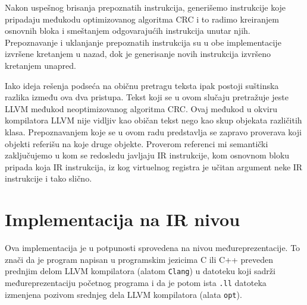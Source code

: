 \documentclass[12pt,oneside]{memoir}
\begin{document}
Nakon uspešnog brisanja prepoznatih instrukcija, generišemo instrukcije koje pripadaju međukodu optimizovanog algoritma CRC i to radimo kreiranjem osnovnih bloka i smeštanjem odgovarajućih instrukcija unutar njih. Prepoznavanje i uklanjanje prepoznatih instrukcija su u obe implementacije izvršene kretanjem u nazad, dok je generisanje novih instrukcija izvršeno kretanjem unapred. 


Iako ideja rešenja podseća na običnu pretragu teksta ipak postoji suštinska razlika između ova dva pristupa. 
Tekst koji se u ovom slučaju pretražuje jeste LLVM međukod neoptimizovanog algoritma CRC. Ovaj međukod u okviru kompilatora LLVM nije vidljiv kao običan tekst nego kao skup objekata različitih klasa. Prepoznavanjem koje se u ovom radu predstavlja se zapravo proverava koji objekti referišu na koje druge objekte. Proverom referenci mi semantički zaključujemo u kom se redosledu javljaju IR instrukcije, kom osnovnom bloku pripada koja IR instrukcija, iz kog virtuelnog registra je učitan argument neke IR instrukcije i tako slično.


\section{Implementacija na IR nivou}

Ova implementacija je u potpunosti sprovedena na nivou međureprezentacije. To znači da je 
program napisan u programskim jezicima C ili C++ preveden prednjim delom LLVM 
kompilatora (alatom \texttt{Clang}) u datoteku koji sadrži 
međureprezentaciju početnog programa i da je potom ista \texttt{.ll} datoteka izmenjena pozivom srednjeg dela LLVM kompilatora (alata \texttt{opt}). 
\end{document}
